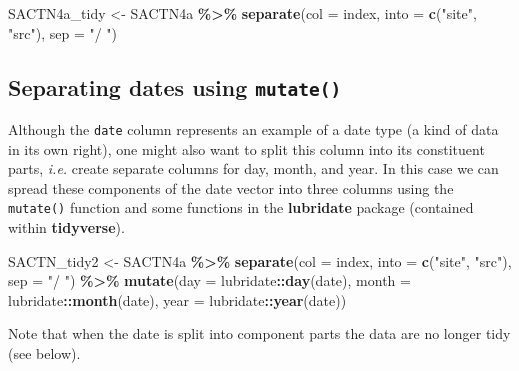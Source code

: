 \documentclass[
]{book}
\newenvironment{Shaded}{\begin{snugshade}}{\end{snugshade}}
\newcommand{\DataTypeTok}[1]{\textcolor[rgb]{0.13,0.29,0.53}{#1}}
\newcommand{\KeywordTok}[1]{\textcolor[rgb]{0.13,0.29,0.53}{\textbf{#1}}}
\newcommand{\NormalTok}[1]{#1}
\newcommand{\OperatorTok}[1]{\textcolor[rgb]{0.81,0.36,0.00}{\textbf{#1}}}
\newcommand{\StringTok}[1]{\textcolor[rgb]{0.31,0.60,0.02}{#1}}
\begin{document}
\begin{Shaded}
\begin{Highlighting}[]
\NormalTok{SACTN4a\_tidy <{-}}\StringTok{ }\NormalTok{SACTN4a }\OperatorTok{\%>\%}\StringTok{ }
\StringTok{  }\KeywordTok{separate}\NormalTok{(}\DataTypeTok{col =}\NormalTok{ index, }\DataTypeTok{into =} \KeywordTok{c}\NormalTok{(}\StringTok{"site"}\NormalTok{, }\StringTok{"src"}\NormalTok{), }\DataTypeTok{sep =} \StringTok{"/ "}\NormalTok{)}
\end{Highlighting}
\end{Shaded}

\hypertarget{separating-dates-using-mutate}{%
\subsection{\texorpdfstring{Separating dates using \texttt{mutate()}}{Separating dates using mutate()}}\label{separating-dates-using-mutate}}

Although the \texttt{date} column represents an example of a date type (a kind of data in its own right), one might also want to split this column into its constituent parts, \emph{i.e.} create separate columns for day, month, and year. In this case we can spread these components of the date vector into three columns using the \texttt{mutate()} function and some functions in the \textbf{lubridate} package (contained within \textbf{tidyverse}).

\begin{Shaded}
\begin{Highlighting}[]
\NormalTok{SACTN\_tidy2 <{-}}\StringTok{ }\NormalTok{SACTN4a }\OperatorTok{\%>\%}\StringTok{ }
\StringTok{  }\KeywordTok{separate}\NormalTok{(}\DataTypeTok{col =}\NormalTok{ index, }\DataTypeTok{into =} \KeywordTok{c}\NormalTok{(}\StringTok{"site"}\NormalTok{, }\StringTok{"src"}\NormalTok{), }\DataTypeTok{sep =} \StringTok{"/ "}\NormalTok{) }\OperatorTok{\%>\%}\StringTok{ }
\StringTok{  }\KeywordTok{mutate}\NormalTok{(}\DataTypeTok{day =}\NormalTok{ lubridate}\OperatorTok{::}\KeywordTok{day}\NormalTok{(date),}
         \DataTypeTok{month =}\NormalTok{ lubridate}\OperatorTok{::}\KeywordTok{month}\NormalTok{(date),}
         \DataTypeTok{year =}\NormalTok{ lubridate}\OperatorTok{::}\KeywordTok{year}\NormalTok{(date))}
\end{Highlighting}
\end{Shaded}

Note that when the date is split into component parts the data are no longer tidy (see below).
\end{document}
